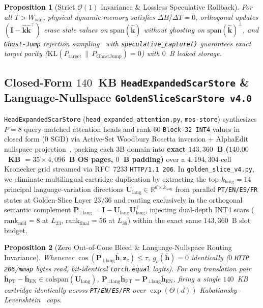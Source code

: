 \documentclass[10pt,twocolumn]{article}
\newtheorem{proposition}{Proposition}
\begin{document}
\begin{proposition}[Strict $\mathcal{O}(1)$ Invariance \& Lossless Speculative Rollback]
\label{prop:scache_ghost}
For all $T > W_{\text{win}}$, physical dynamic memory satisfies $\Delta B / \Delta T = 0$, orthogonal updates $(\mathbf{I} - \hat{\mathbf{k}}\hat{\mathbf{k}}^\top)$ erase stale values on $\mathrm{span}(\hat{\mathbf{k}})$ without ghosting on $\mathrm{span}(\hat{\mathbf{k}})^\perp$, and \texttt{Ghost-Jump} rejection sampling~\citep{leviathan2023fast} with \texttt{speculative\_capture()} guarantees exact target parity ($\mathrm{KL}(P_{\text{target}} \,\|\, P_{\text{GhostJump}}) = 0$) with $0$~B leaked storage.
\end{proposition}

\subsection{Closed-Form $140$~KB \texttt{HeadExpandedScarStore} \& Language-Nullspace \texttt{GoldenSliceScarStore v4.0}}
\texttt{HeadExpandedScarStore} (\texttt{head\_expanded\_attention.py}, \texttt{mos-store}) synthesizes $P=8$ query-matched attention heads and rank-$60$ \texttt{Block-32 INT4} values in closed form ($0$ SGD) via Active-Set Woodbury Rosetta inversion + AlphaEdit nullspace projection~\citep{fang2025alphaedit}, packing each $3\text{B}$ domain into \textbf{exact $143{,}360$~B ($140.00$~KB $= 35 \times 4{,}096$~B OS pages, $0$~B padding)} over a $4{,}194{,}304$-cell Kronecker grid streamed via RFC~7233 \texttt{HTTP/1.1 206}. In \texttt{golden\_slice\_v4.py}, we eliminate multilingual cartridge duplication by extracting the top-$k_{\text{lang}}=14$ principal language-variation directions $\mathbf{U}_{\text{lang}} \in \mathbb{R}^{d \times k_{\text{lang}}}$ from parallel \texttt{PT/EN/ES/FR} states at Golden-Slice Layer $23/36$ and routing exclusively in the orthogonal semantic complement $\mathbf{P}_{\perp\text{lang}} = \mathbf{I} - \mathbf{U}_{\text{lang}}\mathbf{U}_{\text{lang}}^\top$, injecting dual-depth INT4 scars ($\text{rank}_{\text{mid}}=8$ at $L_{23}$, $\text{rank}_{\text{final}}=56$ at $L_{36}$) within the exact same $143{,}360$~B slot budget.

\begin{proposition}[Zero Out-of-Cone Bleed \& Language-Nullspace Routing Invariance]
\label{prop:scarstore}
Whenever $\cos(\mathbf{P}_{\perp\text{lang}}\bar{\mathbf{h}}, \mathbf{z}_c) \le \tau$, $g_c(\bar{\mathbf{h}}) = 0$ identically ($0$ \texttt{HTTP 206}/\texttt{mmap} bytes read, bit-identical \texttt{torch.equal} logits). For any translation pair $\bar{\mathbf{h}}_{\text{PT}} - \bar{\mathbf{h}}_{\text{EN}} \in \mathrm{colspan}(\mathbf{U}_{\text{lang}})$, $\mathbf{P}_{\perp\text{lang}}\bar{\mathbf{h}}_{\text{PT}} = \mathbf{P}_{\perp\text{lang}}\bar{\mathbf{h}}_{\text{EN}}$, firing a single $140$~KB cartridge identically across \texttt{PT/EN/ES/FR} over $\exp(\Theta(d))$ Kabatiansky--Levenshtein~\citep{kabatiansky1978bounds} caps.
\end{proposition}
\end{document}
